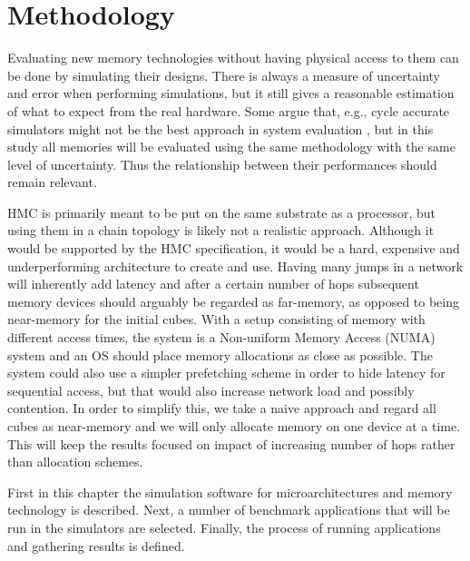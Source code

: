 \chapter{Methodology} \label{method}
Evaluating new memory technologies without having physical access to them can be done by simulating their designs. There is always a measure of uncertainty and error when performing simulations, but it still gives a reasonable estimation of what to expect from the real hardware. Some argue that, e.g., cycle accurate simulators might not be the best approach in system evaluation \cite{weaver2008cycle}, but in this study all memories will be evaluated  using the same methodology with the same level of uncertainty. Thus the relationship between their performances should remain relevant. 
\bigskip

HMC is primarily meant to be put on the same substrate as a processor, but using them in a chain topology is likely not a realistic approach. Although it would be supported by the HMC specification, it would be a hard, expensive and underperforming architecture to create and use. Having many jumps in a network will inherently add latency and after a certain number of hops subsequent memory devices should arguably be regarded as far-memory, as opposed to being near-memory for the initial cubes. With a setup consisting of memory with different access times, the system is a Non-uniform Memory Access (NUMA) system and an OS should place memory allocations as close as possible. The system could also use a simpler prefetching scheme in order to hide latency for sequential access, but that would also increase network load and possibly contention. In order to simplify this, we take a naive approach and regard all cubes as near-memory and we will only allocate memory on one device at a time. This will keep the results focused on impact of increasing number of hops rather than allocation schemes.
\bigskip

First in this chapter the simulation software for microarchitectures and memory technology is described. Next, a number of benchmark applications that will be run in the simulators are selected. Finally, the process of running applications and gathering results is defined.


